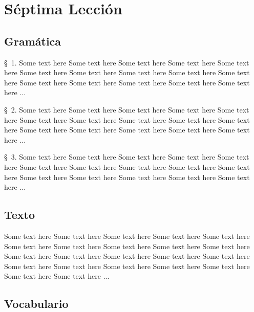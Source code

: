 
\chapter{Séptima Lección} %

\label{ch:lesson07} %



\Large{\section*{Gramática}}

\S\ 1. Some text here Some text here Some text here Some text here Some text here Some text here Some text here Some text here Some text here Some text here Some text here Some text here Some text here Some text here Some text here ...

\S\ 2. Some text here Some text here Some text here Some text here Some text here Some text here Some text here Some text here Some text here Some text here Some text here Some text here Some text here Some text here Some text here ...

\S\ 3. Some text here Some text here Some text here Some text here Some text here Some text here Some text here Some text here Some text here Some text here Some text here Some text here Some text here Some text here Some text here ...

\Large{\section*{Texto}}

Some text here Some text here Some text here Some text here Some text here Some text here Some text here Some text here Some text here Some text here Some text here Some text here Some text here Some text here Some text here Some text here Some text here Some text here Some text here Some text here Some text here Some text here ...

\Large{\section*{Vocabulario}}

